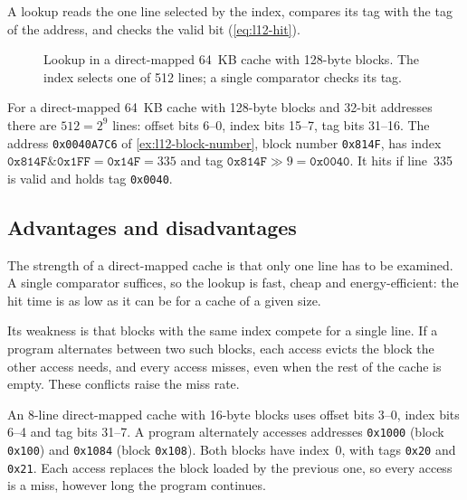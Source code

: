 \documentclass[../main.tex]{subfiles}
\begin{document}
A lookup reads the one line selected by the index, compares its tag with the
tag of the address, and checks the valid bit (\cref{eq:l12-hit}).

\begin{figure}[htbp]
  \centering
  
  \caption{Lookup in a direct-mapped 64~KB cache with
    128-byte blocks.  The index selects one of 512 lines; a single
    comparator checks its tag.}
  \label{fig:l12-direct-mapped}
\end{figure}

\begin{example}
  \label{ex:l12-dm-fields}
  For a direct-mapped 64~KB cache with 128-byte blocks
  and 32-bit addresses there are $512 = 2^{9}$ lines: offset bits 6--0,
  index bits 15--7, tag bits 31--16.  The address \texttt{0x0040A7C6} of
  \cref{ex:l12-block-number}, block number \texttt{0x814F}, has index
  $\texttt{0x814F} \mathbin{\&} \texttt{0x1FF} = \texttt{0x14F} = 335$ and
  tag $\texttt{0x814F} \gg 9 = \texttt{0x0040}$.  It hits if line~335 is
  valid and holds tag \texttt{0x0040}.
\end{example}

\subsection{Advantages and disadvantages}

The strength of a direct-mapped cache is that only one line has to be
examined.  A single comparator suffices, so the lookup is fast, cheap and
energy-efficient: the hit time is as low as it can be for a cache of a given
size.

Its weakness is that blocks with the same index compete for a single line.
If a program alternates between two such blocks, each access evicts the block
the other access needs, and every access misses, even when the rest of the
cache is empty.  These conflicts raise the miss rate.

\begin{example}
  \label{ex:l12-dm-conflict}
  An 8-line direct-mapped cache with 16-byte blocks uses offset bits
  3--0, index bits 6--4 and tag bits 31--7.  A program alternately accesses
  addresses \texttt{0x1000} (block \texttt{0x100}) and \texttt{0x1084}
  (block \texttt{0x108}).  Both blocks have index~0, with tags \texttt{0x20}
  and \texttt{0x21}.  Each access replaces the block loaded by the previous
  one, so every access is a miss, however long the program continues.
\end{example}
\end{document}

